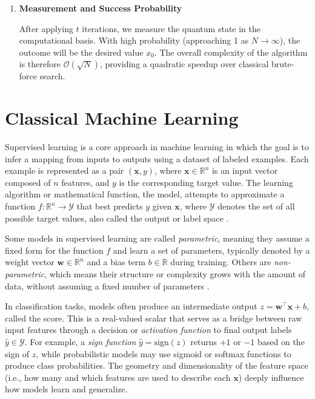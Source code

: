 \documentclass[12pt,a4paper,openany]{report}
\let\parencite\citep
\begin{document}
\begin{enumerate}
    \[
    \cos(\theta) = \sqrt{\frac{N - 1}{N}}, \quad \text{so } \theta \approx \frac{1}{\sqrt{N}} \text{ for large } N.
    \]

    To maximize the probability of measuring \( x_0 \), the number of iterations should be approximately:

    \[
    t = \left\lfloor \frac{\pi}{4} \sqrt{N} \right\rfloor.
    \]

    \item \textbf{Measurement and Success Probability}

    After applying \( t \) iterations, we measure the quantum state in the computational basis. With high probability (approaching 1 as \( N \to \infty \)), the outcome will be the desired value \( x_0 \). The overall complexity of the algorithm is therefore \( \mathcal{O}(\sqrt{N}) \), providing a quadratic speedup over classical brute-force search.
\end{enumerate}

\section{Classical Machine Learning}
Supervised learning is a core approach in machine learning in which the goal is to infer a mapping from inputs to outputs using a dataset of labeled examples. Each example is represented as a pair $(\mathbf{x}, y)$, where $\mathbf{x} \in \mathbb{R}^n$ is an input vector composed of $n$ features, and $y$ is the corresponding target value. The learning algorithm or mathematical function, the model, attempts to approximate a function $f: \mathbb{R}^n \rightarrow \mathcal{Y}$ that best predicts $y$ given $\mathbf{x}$, where \(\mathcal{Y}\) denotes the set of all possible target values, also called the output or label space \parencite{murphy2012}.


Some models in supervised learning are called \textit{parametric}, meaning they assume a fixed form for the function $f$ and learn a set of parameters, typically denoted by a weight vector \(\mathbf{w} \in \mathbb{R}^n\)  and a bias term \(b \in \mathbb{R}\) during training. Others are \textit{non-parametric}, which means their structure or complexity grows with the amount of data, without assuming a fixed number of parameters \parencite{murphy2012}.


In classification tasks, models often produce an intermediate output $z = \mathbf{w}^\top \mathbf{x} + b$, called the score. This  is a real-valued scalar that serves as a bridge between raw input features through a decision or \textit{activation function} to final output labels \( \hat{y} \in \mathcal{Y} \). For example, a \textit{sign function} \( \hat{y} = \text{sign}(z)\) returns $+1$ or $-1$ based on the sign of $z$, while probabilistic models may use sigmoid or softmax functions to produce class probabilities. The geometry and dimensionality of the feature space (i.e., how many and which features are used to describe each $\mathbf{x}$) deeply influence how models learn and generalize.
\end{document}
